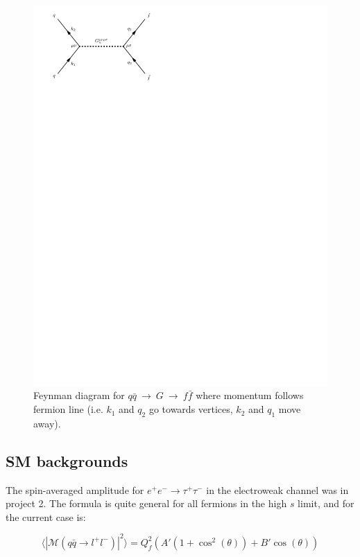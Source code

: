 \documentclass[11pt,a4paper]{article}
\begin{document}
\begin{figure}[H]
	\centering
	\includegraphics[trim={0.5cm 22cm 11.5cm 0cm},scale=1]{feynGraphs/qqbar_G_ffbar}
	\caption{Feynman diagram for $q\bar{q}\:\rightarrow\:G\:\rightarrow\:f\bar{f}$ where momentum follows fermion line (i.e. $k_1$ and $q_2$ go towards vertices, $k_2$ and $q_1$ move away).}
	\label{fig:gravitonChannel}
\end{figure}

\subsection{SM backgrounds}
The spin-averaged amplitude for $e^+e^- \rightarrow \tau^+\tau^-$ in the electroweak channel was in project 2. The formula is quite general for all fermions in the high $s$ limit, and for the current case is:

\begin{equation}
	\langle|\mathcal{M}(q\bar{q}\rightarrow l^+l^-)|^2\rangle = Q_f^2\left(A'\left(1+\cos^2(\theta)\right) + B'\cos(\theta)\right)
\end{equation}
\end{document}
